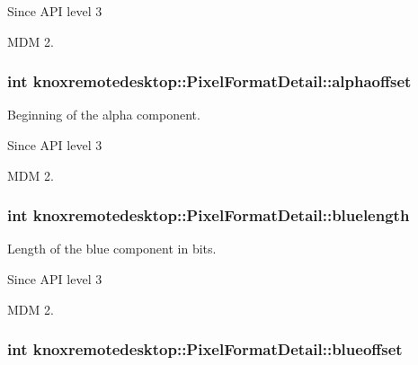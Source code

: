 \begin{DoxySince}{\-Since}
\-A\-P\-I level 3 

\-M\-D\-M 2. 
\end{DoxySince}
\hypertarget{structknoxremotedesktop_1_1PixelFormatDetail_a4cfaeee3077ff3609b0d7a5aab4e5a83}{
\subsubsection[{alphaoffset}]{\setlength{\rightskip}{0pt plus 5cm}int {\bf knoxremotedesktop\-::\-Pixel\-Format\-Detail\-::alphaoffset}}}\label{structknoxremotedesktop_1_1PixelFormatDetail_a4cfaeee3077ff3609b0d7a5aab4e5a83}


\-Beginning of the alpha component. 

\begin{DoxySince}{\-Since}
\-A\-P\-I level 3 

\-M\-D\-M 2. 
\end{DoxySince}
\hypertarget{structknoxremotedesktop_1_1PixelFormatDetail_aeb798caab6629e147478319285d2591f}{
\subsubsection[{bluelength}]{\setlength{\rightskip}{0pt plus 5cm}int {\bf knoxremotedesktop\-::\-Pixel\-Format\-Detail\-::bluelength}}}\label{structknoxremotedesktop_1_1PixelFormatDetail_aeb798caab6629e147478319285d2591f}


\-Length of the blue component in bits. 

\begin{DoxySince}{\-Since}
\-A\-P\-I level 3 

\-M\-D\-M 2. 
\end{DoxySince}
\hypertarget{structknoxremotedesktop_1_1PixelFormatDetail_a7afad9374c4aab4d1fbe2a15396ade47}{
\subsubsection[{blueoffset}]{\setlength{\rightskip}{0pt plus 5cm}int {\bf knoxremotedesktop\-::\-Pixel\-Format\-Detail\-::blueoffset}}}\label{structknoxremotedesktop_1_1PixelFormatDetail_a7afad9374c4aab4d1fbe2a15396ade47}


